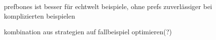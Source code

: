 prefbones ist besser für echtwelt beispiele, ohne prefs zuverlässiger bei komplizierten beispielen

kombination aus strategien auf fallbeispiel optimieren(?)